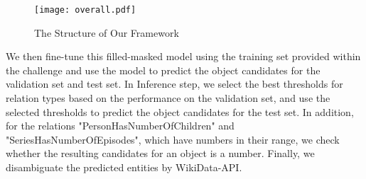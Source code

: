 \documentclass[]{ceurart}
\begin{document}
\begin{figure}
    \centering
    \texttt{[image: overall.pdf]}
    \caption{The Structure of Our Framework}
    \label{fig:overall}
\end{figure}

We then fine-tune this filled-masked model using the training set provided within the challenge and use the model to predict the object candidates for the validation set and test set. In Inference step, we select the best thresholds for relation types based on the performance on the validation set, and use the selected thresholds to predict the object candidates for the test set.  In addition, for the relations "PersonHasNumberOfChildren" and "SeriesHasNumberOfEpisodes", which have numbers in their range, we check whether the resulting candidates for an object is a number. Finally, we disambiguate the predicted entities by WikiData-API.
\end{document}
